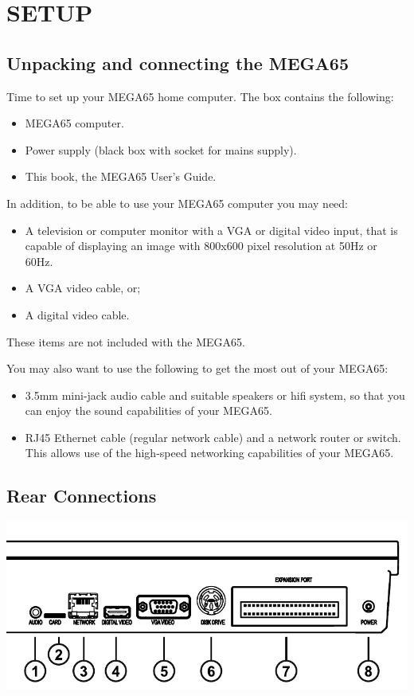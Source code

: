 \chapter{SETUP}
\section{Unpacking and connecting the MEGA65}

Time to set up your MEGA65 home computer.
The box contains the following:
\begin{itemize}
\setlength\itemsep{-0.75mm}
\item MEGA65 computer.
\item Power supply (black box with socket for mains supply).
\item This book, the MEGA65 User's Guide.
\end{itemize}

In addition, to be able to use your MEGA65 computer you may need:
\begin{itemize}
\item A television or computer monitor with a VGA or digital video input, that is capable of displaying an image with 800x600 pixel resolution at 50Hz or 60Hz.
\item A VGA video cable, or;
\item A digital video cable.
\end{itemize}

These items are not included with the MEGA65.

You may also want to use the following to get the most out of your MEGA65:
\begin{itemize}
\item 3.5mm mini-jack audio cable and suitable speakers or hifi system, so that you can enjoy the sound capabilities of your MEGA65.
\item RJ45 Ethernet cable (regular network cable) and a network router or switch. This allows use of the high-speed networking capabilities of your MEGA65.
\end{itemize}

\section{Rear Connections}

\includegraphics[width=\linewidth]{images/illustrations/mega65-rear.pdf}

